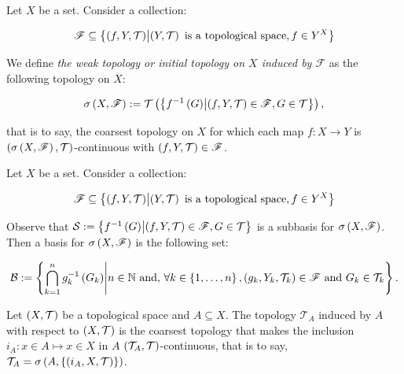 \begin{definition}
  Let $X$ be a set. Consider a collection:
  
  \begin{equation}
    \mathscr{F}\subseteq\left\{\left(f,Y,\mathcal{T}\right)\middle|\left(Y,\mathcal{T}\right)\text{ is a topological space}, f\in Y^X\right\}
  \end{equation}

  We define \textit{the weak topology or initial topology on $X$ induced by $\mathscr{F}$} as the following topology on $X$:
  
  \begin{equation}
    \sigma\left(X,\mathscr{F}\right):=\mathcal{T}\left(\left\{f^{-1}\left(G\right)\middle|\left(f,Y,\mathcal{T}\right)\in\mathscr{F},G\in\mathcal{T}\right\}\right),
  \end{equation}

  that is to say, the coarsest topology on $X$ for which each map $f:X\rightarrow Y$ is $\left(\sigma\left(X,\mathscr{F}\right),\mathcal{T}\right)$-continuous with $\left(f,Y,\mathcal{T}\right)\in\mathscr{F}$. 
\end{definition}

\begin{remark}
  Let $X$ be a set. Consider a collection:
  
  \begin{equation}
    \mathscr{F}\subseteq\left\{\left(f,Y,\mathcal{T}\right)\middle|\left(Y,\mathcal{T}\right)\text{ is a topological space}, f\in Y^X\right\}
  \end{equation}

  Observe that $\mathcal{S}:=\left\{f^{-1}\left(G\right)\middle|\left(f,Y,\mathcal{T}\right)\in\mathscr{F},G\in\mathcal{T}\right\}$ is a subbasis for $\sigma\left(X,\mathscr{F}\right)$. Then a basis for $\sigma\left(X,\mathscr{F}\right)$ is the following set:

  \begin{equation}
    \mathcal{B}:=\left\{\bigcap_{k=1}^{n}{g_k^{-1}\left(G_k\right)}\middle|n\in\mathbb{N}\text{ and, }\forall k\in\left\{1,\dots,n\right\},\left(g_k,Y_k,\mathcal{T}_k\right)\in\mathscr{F}\text{ and }G_k\in\mathcal{T}_k\right\}.
  \end{equation}
\end{remark}

\begin{remark}
  Let $\left(X,\mathcal{T}\right)$ be a topological space and $A\subseteq X$. The topology $\mathcal{T}_A$ induced by $A$ with respect to $\left(X,\mathcal{T}\right)$ is the coarsest topology that makes the inclusion $i_A:x\in A\mapsto x\in X$ in $A$ $\left(\mathcal{T}_A,\mathcal{T}\right)$-continuous, that is to say, $\mathcal{T}_A=\sigma\left(A,\left\{\left(i_A,X,\mathcal{T}\right)\right\}\right)$.
\end{remark}

